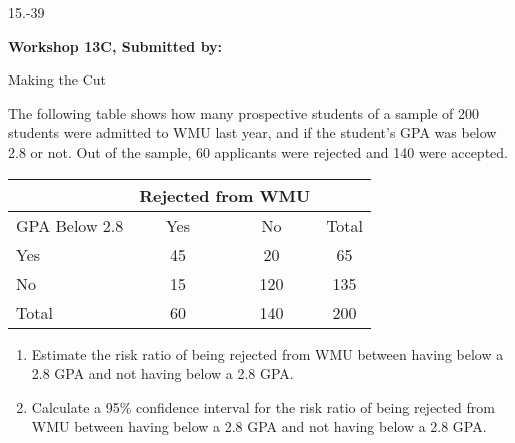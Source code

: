 \begin{exsol@exercise}{15.-39}
    \begin{center}
\begin{flushleft}\textbf{\large \hfill Workshop 13C, Submitted by: }\end{flushleft}

\end{center}

Making the Cut

The following table shows how many prospective students of a sample of 200 students were admitted to WMU last year, and if the student's GPA was below 2.8 or not. Out of the sample, 60 applicants were rejected and 140 were accepted.
			
\begin{tabular}{@{} lccc @{}} \hline				
 	& \multicolumn{2}{c}{Rejected from WMU} \\ \hline				
GPA Below 2.8 &	Yes &	No &	Total  \\ \hline
Yes &	45 &	20 &	65 \\
No &	15 &	120 &	135 \\ \hline
Total &	60 &	140 &	200 \\ \hline
\end{tabular}
				
\begin{enumerate}
  \item Estimate the risk ratio of being rejected from WMU between having below a 2.8 GPA and not having below a 2.8 GPA.
  \item Calculate a 95\% confidence interval for the risk ratio of being rejected from WMU between having below a 2.8 GPA and not having below a 2.8 GPA.
\end{enumerate}

\end{exsol@exercise}
